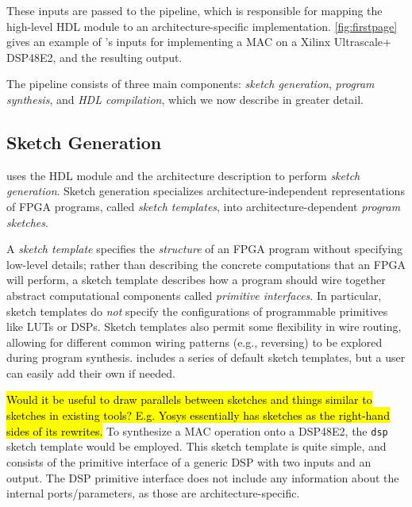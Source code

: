 These inputs are passed to the \lr pipeline,
  which is responsible for mapping the high-level
  HDL module to an architecture-specific
  implementation.
\cref{fig:firstpage} gives an example
  of \lr's inputs for
  implementing a MAC on a Xilinx
  Ultrascale+ DSP48E2,
  and the resulting
  output.
  
The \lr pipeline consists of
  three main components:
  \textit{sketch generation},
  \textit{program synthesis},
  and \textit{HDL compilation},
  which
  we now describe 
  in greater detail.
  


\subsection{Sketch Generation}

\lr uses the HDL module and
  the architecture description
  to perform
  \textit{sketch generation}.
Sketch generation
  specializes architecture-independent
  representations of FPGA programs, called
  \textit{sketch templates},
  into architecture-dependent
  \textit{program sketches}.

A \textit{sketch template} specifies
  the \textit{structure}
  of an
  FPGA program
  without specifying
  low-level details;
  rather than describing the concrete
  computations that an FPGA will
  perform, a sketch template describes
  how a program should wire together
  abstract computational components
  called \textit{primitive interfaces}.
In particular,
  sketch templates do \textit{not} specify
  the configurations of programmable
  primitives like LUTs or DSPs. 
Sketch templates also permit 
  some flexibility in wire routing,
  allowing for different common
  wiring patterns
  (e.g., reversing)
  to be explored
  during program synthesis.
\lr
  includes a series of default
  sketch templates,
  but a user can easily add their own if needed.

\hl{Would it be useful to draw parallels 
  between sketches and things similar to sketches
  in existing tools? E.g. Yosys essentially
  has sketches as the right-hand sides of its
  rewrites.}
To synthesize a MAC operation onto a DSP48E2,
  the \texttt{dsp} sketch template would be employed.
  This sketch template is quite simple, and consists of the
  primitive interface of a generic DSP with two inputs and an output.
  The DSP primitive interface does not include any information
  about the internal ports/parameters, as those are architecture-specific.
  
